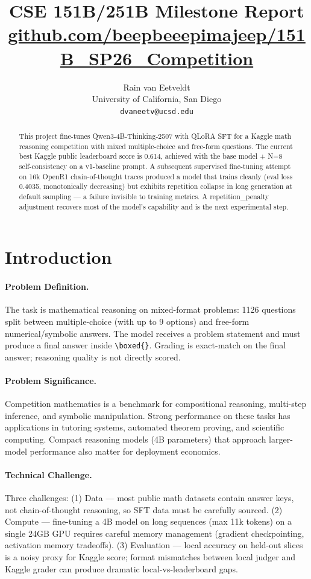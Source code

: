 \documentclass{article}
\title{CSE 151B/251B Milestone Report\\
  {\small \href{https://github.com/beepbeeepimajeep/151B_SP26_Competition}{github.com/beepbeeepimajeep/151B\_SP26\_Competition}}}
\author{%
  Rain van Eetveldt \\
  University of California, San Diego \\
  \texttt{dvaneetv@ucsd.edu}
}
\begin{document}
\maketitle


\begin{abstract}
This project fine-tunes Qwen3-4B-Thinking-2507 with QLoRA SFT for a Kaggle math reasoning competition with mixed multiple-choice and free-form questions. The current best Kaggle public leaderboard score is 0.614, achieved with the base model + N=8 self-consistency on a v1-baseline prompt. A subsequent supervised fine-tuning attempt on 16k OpenR1 chain-of-thought traces produced a model that trains cleanly (eval loss 0.4035, monotonically decreasing) but exhibits repetition collapse in long generation at default sampling --- a failure invisible to training metrics. A repetition\_penalty adjustment recovers most of the model's capability and is the next experimental step.
\end{abstract}

\section{Introduction}
\label{sec:intro}

\paragraph{Problem Definition.}
The task is mathematical reasoning on mixed-format problems: 1126 questions split between multiple-choice (with up to 9 options) and free-form numerical/symbolic answers. The model receives a problem statement and must produce a final answer inside \texttt{\textbackslash boxed\{\}}. Grading is exact-match on the final answer; reasoning quality is not directly scored.

\paragraph{Problem Significance.}
Competition mathematics is a benchmark for compositional reasoning, multi-step inference, and symbolic manipulation. Strong performance on these tasks has applications in tutoring systems, automated theorem proving, and scientific computing. Compact reasoning models (4B parameters) that approach larger-model performance also matter for deployment economics.

\paragraph{Technical Challenge.}
Three challenges: (1) Data --- most public math datasets contain answer keys, not chain-of-thought reasoning, so SFT data must be carefully sourced. (2) Compute --- fine-tuning a 4B model on long sequences (max 11k tokens) on a single 24GB GPU requires careful memory management (gradient checkpointing, activation memory tradeoffs). (3) Evaluation --- local accuracy on held-out slices is a noisy proxy for Kaggle score; format mismatches between local judger and Kaggle grader can produce dramatic local-vs-leaderboard gaps.
\end{document}
